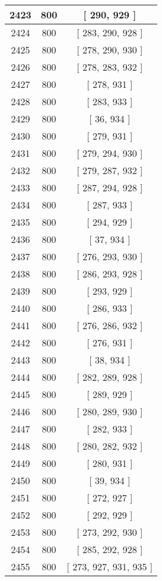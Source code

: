 \begin{center}
\begin{longtable}[H]{|| c c c ||}
\hline
2423 & 800 & [ 290, 929 ] \\ 
\hline
2424 & 800 & [ 283, 290, 928 ] \\ 
\hline
2425 & 800 & [ 278, 290, 930 ] \\ 
\hline
2426 & 800 & [ 278, 283, 932 ] \\ 
\hline
2427 & 800 & [ 278, 931 ] \\ 
\hline
2428 & 800 & [ 283, 933 ] \\ 
\hline
2429 & 800 & [ 36, 934 ] \\ 
\hline
2430 & 800 & [ 279, 931 ] \\ 
\hline
2431 & 800 & [ 279, 294, 930 ] \\ 
\hline
2432 & 800 & [ 279, 287, 932 ] \\ 
\hline
2433 & 800 & [ 287, 294, 928 ] \\ 
\hline
2434 & 800 & [ 287, 933 ] \\ 
\hline
2435 & 800 & [ 294, 929 ] \\ 
\hline
2436 & 800 & [ 37, 934 ] \\ 
\hline
2437 & 800 & [ 276, 293, 930 ] \\ 
\hline
2438 & 800 & [ 286, 293, 928 ] \\ 
\hline
2439 & 800 & [ 293, 929 ] \\ 
\hline
2440 & 800 & [ 286, 933 ] \\ 
\hline
2441 & 800 & [ 276, 286, 932 ] \\ 
\hline
2442 & 800 & [ 276, 931 ] \\ 
\hline
2443 & 800 & [ 38, 934 ] \\ 
\hline
2444 & 800 & [ 282, 289, 928 ] \\ 
\hline
2445 & 800 & [ 289, 929 ] \\ 
\hline
2446 & 800 & [ 280, 289, 930 ] \\ 
\hline
2447 & 800 & [ 282, 933 ] \\ 
\hline
2448 & 800 & [ 280, 282, 932 ] \\ 
\hline
2449 & 800 & [ 280, 931 ] \\ 
\hline
2450 & 800 & [ 39, 934 ] \\ 
\hline
2451 & 800 & [ 272, 927 ] \\ 
\hline
2452 & 800 & [ 292, 929 ] \\ 
\hline
2453 & 800 & [ 273, 292, 930 ] \\ 
\hline
2454 & 800 & [ 285, 292, 928 ] \\ 
\hline
2455 & 800 & [ 273, 927, 931, 935 ] \\ 

\end{longtable}
\end{center}
